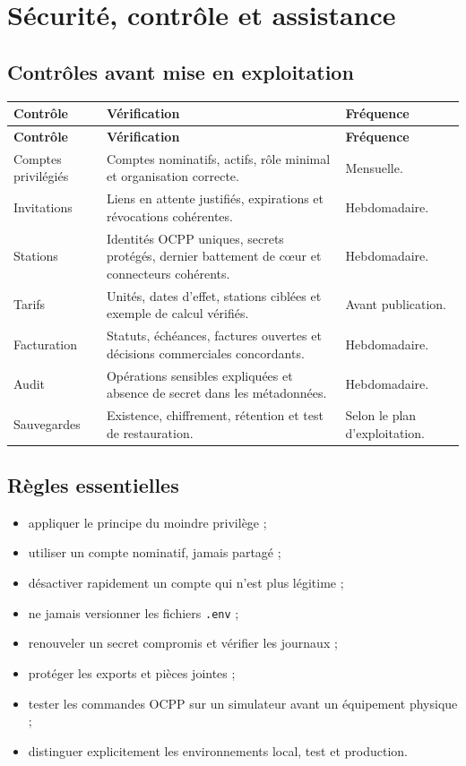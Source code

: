 \chapter{Sécurité, contrôle et assistance}

\section{Contrôles avant mise en exploitation}

\begin{longtable}{|L{4.2cm}|L{7.1cm}|L{3.2cm}|}
  \hline
  \textbf{Contrôle} & \textbf{Vérification} & \textbf{Fréquence} \\ \hline
  \endfirsthead
  \hline
  \textbf{Contrôle} & \textbf{Vérification} & \textbf{Fréquence} \\ \hline
  \endhead
  Comptes privilégiés &
  Comptes nominatifs, actifs, rôle minimal et organisation correcte. &
  Mensuelle. \\ \hline
  Invitations &
  Liens en attente justifiés, expirations et révocations cohérentes. &
  Hebdomadaire. \\ \hline
  Stations &
  Identités OCPP uniques, secrets protégés, dernier battement de cœur et
  connecteurs cohérents. &
  Hebdomadaire. \\ \hline
  Tarifs &
  Unités, dates d'effet, stations ciblées et exemple de calcul vérifiés. &
  Avant publication. \\ \hline
  Facturation &
  Statuts, échéances, factures ouvertes et décisions commerciales concordants. &
  Hebdomadaire. \\ \hline
  Audit &
  Opérations sensibles expliquées et absence de secret dans les métadonnées. &
  Hebdomadaire. \\ \hline
  Sauvegardes &
  Existence, chiffrement, rétention et test de restauration. &
  Selon le plan d'exploitation. \\ \hline
\end{longtable}

\section{Règles essentielles}

\begin{itemize}[leftmargin=*]
  \item appliquer le principe du moindre privilège ;
  \item utiliser un compte nominatif, jamais partagé ;
  \item désactiver rapidement un compte qui n'est plus légitime ;
  \item ne jamais versionner les fichiers \texttt{.env} ;
  \item renouveler un secret compromis et vérifier les journaux ;
  \item protéger les exports et pièces jointes ;
  \item tester les commandes OCPP sur un simulateur avant un équipement
  physique ;
  \item distinguer explicitement les environnements local, test et production.
\end{itemize}

